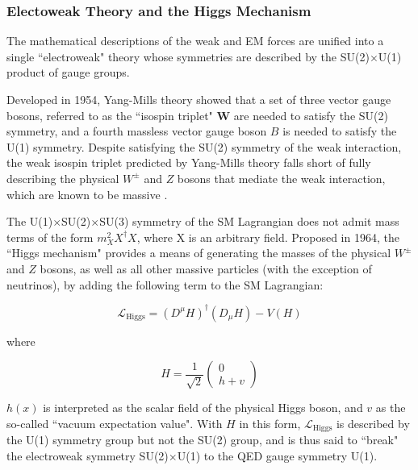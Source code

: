 \subsubsection{Electoweak Theory and the Higgs Mechanism}

The mathematical descriptions of the weak and EM forces are unified into a single ``electroweak" \cite{electroweak_2012} theory whose symmetries are described by the SU(2)\(\times\)U(1) product of gauge groups. 

Developed in 1954, Yang-Mills theory \cite{yang_mills_1954} showed that a set of three vector gauge bosons, referred to as the ``isospin triplet" \(\boldsymbol{W}\) are needed to satisfy the SU(2) symmetry, and a fourth massless vector gauge boson \(B\) is needed to satisfy the U(1) symmetry. Despite satisfying the SU(2) symmetry of the weak interaction, the weak isospin triplet predicted by Yang-Mills theory falls short of fully describing the physical \(W^{\pm}\) and \(Z\) bosons that mediate the weak interaction, which are known to be massive \cite{pdg_2018}.

The U(1)\(\times\)SU(2)\(\times\)SU(3) symmetry of the SM Lagrangian does not admit mass terms of the form \(m_X^2X^\dagger X\), where X is an arbitrary field. Proposed in 1964, the ``Higgs mechanism" \cite{HiggsTheory1,HiggsTheory2,HiggsTheory3} provides a means of generating the masses of the physical \(W^\pm\) and \(Z\) bosons, as well as all other massive particles (with the exception of neutrinos), by adding the following term to the SM Lagrangian:

\begin{equation}
\label{eq:higgs_lagrangian}
\mathcal{L}_\text{Higgs} = (D^\mu H)^\dagger(D_\mu H) - V(H)
\end{equation}

\noindent where

\begin{equation}
H = \frac{1}{\sqrt{2}}
\begin{pmatrix}
0 \\
h+v
\end{pmatrix}
\end{equation}

 \(h(x)\) is interpreted as the scalar field of the physical Higgs boson, and \(v\) as the so-called ``vacuum expectation value". With \(H\) in this form, \(\mathcal{L}_\text{Higgs}\) is described by the U(1) symmetry group but not the SU(2) group, and is thus said to ``break" the electroweak symmetry SU(2)\(\times\)U(1) to the QED gauge symmetry U(1).

